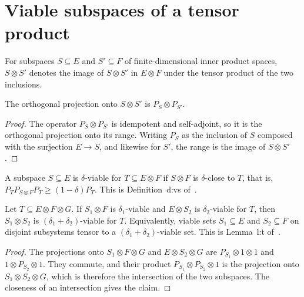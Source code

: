 \section{Viable subspaces of a tensor product}

For subspaces $S\subseteq E$ and $S'\subseteq F$ of finite-dimensional
inner product spaces, $S\otimes S'$ denotes the image of $S\otimes S'$ in
$E\otimes F$ under the tensor product of the two inclusions.

\begin{theorem}
    \label{thm:subspace_tensor_projection}
    \leanok
    The orthogonal projection onto $S\otimes S'$ is $P_S\otimes P_{S'}$.
\end{theorem}

\begin{proof}
    \leanok
    The operator $P_S\otimes P_{S'}$ is idempotent and self-adjoint, so it
    is the orthogonal projection onto its range. Writing $P_S$ as the
    inclusion of $S$ composed with the surjection $E\to S$, and likewise
    for $S'$, the range is the image of $S\otimes S'$.
\end{proof}

\begin{definition}
    \label{def:subspace_viable}
    \leanok
    A subspace $S\subseteq E$ is $\delta$-viable for $T\subseteq E\otimes F$
    if $S\otimes F$ is $\delta$-close to $T$, that is,
    $P_TP_{S\otimes F}P_T\ge(1-\delta)P_T$. This is Definition~d:vs
    of~\cite[lines 433--440]{Arad2016RigorousRG}.
\end{definition}

\begin{theorem}[Tensoring]
    \label{thm:viable_tensoring}
    \leanok
    Let $T\subseteq E\otimes F\otimes G$. If $S_1\otimes F$ is
    $\delta_1$-viable and $E\otimes S_2$ is $\delta_2$-viable for $T$, then
    $S_1\otimes S_2$ is $(\delta_1+\delta_2)$-viable for $T$. Equivalently,
    viable sets $S_1\subseteq E$ and $S_2\subseteq F$ on disjoint
    subsystems tensor to a $(\delta_1+\delta_2)$-viable set. This is
    Lemma~l:t of~\cite[lines 500--523]{Arad2016RigorousRG}.
\end{theorem}

\begin{proof}
    \leanok
    The projections onto $S_1\otimes F\otimes G$ and $E\otimes S_2\otimes G$
    are $P_{S_1}\otimes1\otimes1$ and $1\otimes P_{S_2}\otimes1$. They
    commute, and their product $P_{S_1}\otimes P_{S_2}\otimes1$ is the
    projection onto $S_1\otimes S_2\otimes G$, which is therefore the
    intersection of the two subspaces. The closeness of an intersection
    gives the claim.
\end{proof}
